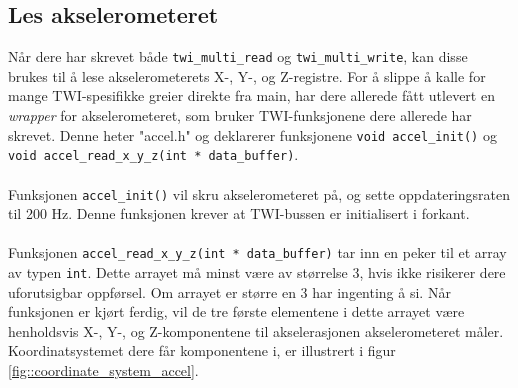 \documentclass[11pt,a4paper]{article}
\begin{document}
\subsection{Les akselerometeret}
Når dere har skrevet både \texttt{twi_multi_read} og \texttt{twi_multi_write}, kan disse brukes til å lese akselerometerets X-, Y-, og Z-registre. For å slippe å kalle for mange TWI-spesifikke greier direkte fra main, har dere allerede fått utlevert en \textit{wrapper} for akselerometeret, som bruker TWI-funksjonene dere allerede har skrevet. Denne heter "accel.h" og deklarerer funksjonene \texttt{void accel_init()} og \texttt{void accel_read_x_y_z(int * data_buffer)}.\\
\\
Funksjonen \texttt{accel_init()} vil skru akselerometeret på, og sette oppdateringsraten til 200 Hz. Denne funksjonen krever at TWI-bussen er initialisert i forkant.\\
\\
Funksjonen \texttt{accel_read_x_y_z(int * data_buffer)} tar inn en peker til et array av typen \texttt{int}. Dette arrayet må minst være av størrelse 3, hvis ikke risikerer dere uforutsigbar oppførsel. Om arrayet er større en 3 har ingenting å si. Når funksjonen er kjørt ferdig, vil de tre første elementene i dette arrayet være henholdsvis X-, Y-, og Z-komponentene til akselerasjonen akselerometeret måler. Koordinatsystemet dere får komponentene i, er illustrert i figur \ref{fig::coordinate_system_accel}.
\end{document}
